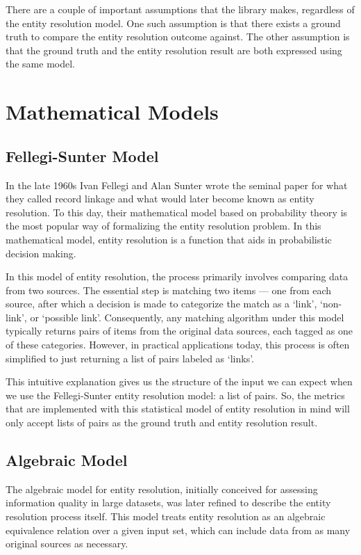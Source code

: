 \documentclass[11pt]{article}
\begin{document}
    There are a couple of important assumptions that the library makes,
    regardless of the entity resolution model.
    One such assumption is that there exists a ground truth\cite{manning2008} to
    compare the entity resolution outcome against.
    The other assumption is that the ground truth and the entity resolution
    result are both expressed using the same model.

    \section{Mathematical Models}\label{sec:models}
    \subsection{Fellegi-Sunter Model}
    In the late 1960s Ivan Fellegi and Alan Sunter wrote the seminal
    paper\cite{fs1969} for what they called record linkage and what would later
    become known as entity resolution.
    To this day, their mathematical model based on probability theory is the
    most popular way of formalizing the entity resolution problem.
    In this mathematical model, entity resolution is a function that aids in 
    probabilistic decision making.
    
    In this model of entity resolution, the process primarily involves comparing
    data from two sources.
    The essential step is matching two items --- one from each source, after
    which a decision is made to categorize the match as a `link', `non-link', or
    `possible link'.
    Consequently, any matching algorithm under this model typically returns
    pairs of items from the original data sources, each tagged as one of these
    categories.
    However, in practical applications today, this process is often simplified
    to just returning a list of pairs labeled as `links'.

    This intuitive explanation gives us the structure of the input we can expect
    when we use the Fellegi-Sunter entity resolution model: a list of pairs.
    So, the metrics that are implemented with this statistical model of entity
    resolution in mind will only accept lists of pairs as the ground truth and
    entity resolution result.

    \subsection{Algebraic Model}
    The algebraic model for entity resolution, initially conceived for assessing
    information quality in large datasets\cite{tal2007algebraic}, was later
    refined to describe the entity resolution process itself\cite{Tal11}.
    This model treats entity resolution as an algebraic equivalence relation
    over a given input set, which can include data from as many original sources
    as necessary.
    
\end{document}
